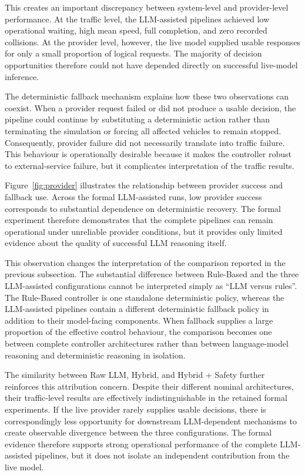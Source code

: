 \documentclass[letterpaper,10pt,conference]{ieeeconf}
\begin{document}
This creates an important discrepancy between system-level and provider-level performance. At the traffic level, the LLM-assisted pipelines achieved low operational waiting, high mean speed, full completion, and zero recorded collisions. At the provider level, however, the live model supplied usable responses for only a small proportion of logical requests. The majority of decision opportunities therefore could not have depended directly on successful live-model inference.



The deterministic fallback mechanism explains how these two observations can coexist. When a provider request failed or did not produce a usable decision, the pipeline could continue by substituting a deterministic action rather than terminating the simulation or forcing all affected vehicles to remain stopped. Consequently, provider failure did not necessarily translate into traffic failure. This behaviour is operationally desirable because it makes the controller robust to external-service failure, but it complicates interpretation of the traffic results.



Figure~\ref{fig:provider} illustrates the relationship between provider success and fallback use. Across the formal LLM-assisted runs, low provider success corresponds to substantial dependence on deterministic recovery. The formal experiment therefore demonstrates that the complete pipelines can remain operational under unreliable provider conditions, but it provides only limited evidence about the quality of successful LLM reasoning itself.



This observation changes the interpretation of the comparison reported in the previous subsection. The substantial difference between Rule-Based and the three LLM-assisted configurations cannot be interpreted simply as ``LLM versus rules''. The Rule-Based controller is one standalone deterministic policy, whereas the LLM-assisted pipelines contain a different deterministic fallback policy in addition to their model-facing components. When fallback supplies a large proportion of the effective control behaviour, the comparison becomes one between complete controller architectures rather than between language-model reasoning and deterministic reasoning in isolation.



The similarity between Raw LLM, Hybrid, and Hybrid + Safety further reinforces this attribution concern. Despite their different nominal architectures, their traffic-level results are effectively indistinguishable in the retained formal experiments. If the live provider rarely supplies usable decisions, there is correspondingly less opportunity for downstream LLM-dependent mechanisms to create observable divergence between the three configurations. The formal evidence therefore supports strong operational performance of the complete LLM-assisted pipelines, but it does not isolate an independent contribution from the live model.
\end{document}
